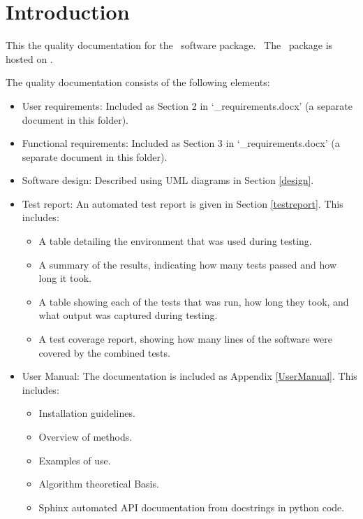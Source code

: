 \documentclass{article}
\begin{document}

\tableofcontents



\clearpage
\pagestyle{long}


\graphicspath{{uml/}{latex/}}

\section{Introduction}\label{introduction}
This the quality documentation for the \packagename\ software package.
\packagedescription\ The \packagename\ package is hosted on \packageurl.

The quality documentation consists of the following elements:
\begin{itemize}
\item User requirements: Included as Section 2 in `\packagename\_requirements.docx' (a separate document in this folder).

\item Functional requirements: Included as Section 3 in `\packagename\_requirements.docx' (a separate document in this folder).

\item Software design: Described using UML diagrams in Section \ref{design}.

\item Test report: An automated test report is given in Section \ref{testreport}. This includes:
\begin{itemize}
\item A table detailing the environment that was used during testing.
\item A summary of the results, indicating how many tests passed and how long it took.
\item A table showing each of the tests that was run, how long they took, and what output was captured during testing.
\item A test coverage report, showing how many lines of the software were covered by the combined tests.
\end{itemize}
\item User Manual: The \packagename documentation is included as Appendix \ref{UserManual}. This includes:
\begin{itemize}
\item Installation guidelines.
\item Overview of methods.
\item Examples of use.
\item Algorithm theoretical Basis.
\item Sphinx automated API documentation from docstrings in python code.
\end{itemize}
\end{itemize}
\end{document}
